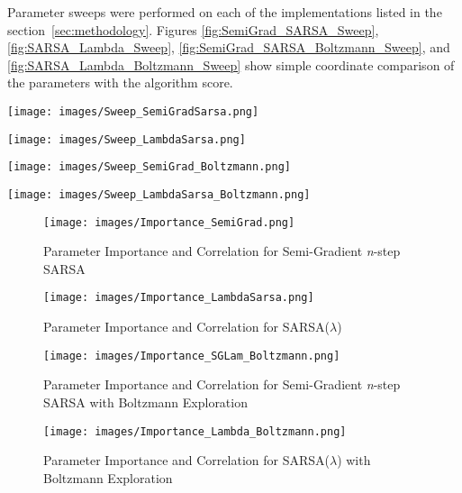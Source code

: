 \documentclass[journal]{IEEEtran}
\begin{document}
Parameter sweeps were performed on each of the implementations listed in the 
section~\ref{sec:methodology}. Figures \ref{fig:SemiGrad_SARSA_Sweep}, \ref{fig:SARSA_Lambda_Sweep},
\ref{fig:SemiGrad_SARSA_Boltzmann_Sweep}, and \ref{fig:SARSA_Lambda_Boltzmann_Sweep} 
show simple coordinate comparison of the parameters with the algorithm score.

\begin{figure*}
  \texttt{[image: images/Sweep\_SemiGradSarsa.png]}
  \caption{Parameter Sweep for Semi-Gradient \emph{n}-step SARSA}
  \label{fig:SemiGrad_SARSA_Sweep}
\end{figure*}
\begin{figure*}
  \texttt{[image: images/Sweep\_LambdaSarsa.png]}
  \caption{Parameter Sweep for SARSA(\(\lambda\))}
  \label{fig:SARSA_Lambda_Sweep}
\end{figure*}
\begin{figure*}
  \texttt{[image: images/Sweep\_SemiGrad\_Boltzmann.png]}
  \caption{Parameter Sweep for Semi-Gradient \emph{n}-step SARSA with Boltzmann Exploration}
  \label{fig:SemiGrad_SARSA_Boltzmann_Sweep}
\end{figure*}
\begin{figure*}
  \texttt{[image: images/Sweep\_LambdaSarsa\_Boltzmann.png]}
  \caption{Parameter Sweep for SARSA(\(\lambda\)) with Boltzmann Exploration}
  \label{fig:SARSA_Lambda_Boltzmann_Sweep}
\end{figure*}

\begin{figure}
  \texttt{[image: images/Importance\_SemiGrad.png]}
  \caption{Parameter Importance and Correlation for Semi-Gradient \emph{n}-step SARSA}
  \label{fig:SemiGrad_SARSA_Importance}
\end{figure}
\begin{figure}
  \texttt{[image: images/Importance\_LambdaSarsa.png]}
  \caption{Parameter Importance and Correlation for SARSA(\(\lambda\))}
  \label{fig:SARSA_Lambda_Importance}
\end{figure}
\begin{figure}
  \texttt{[image: images/Importance\_SGLam\_Boltzmann.png]}
  \caption{Parameter Importance and Correlation for Semi-Gradient \emph{n}-step 
  SARSA with Boltzmann Exploration}
  \label{fig:SemiGrad_SARSA_Boltz_Importance}
\end{figure}
\begin{figure}
  \texttt{[image: images/Importance\_Lambda\_Boltzmann.png]}
  \caption{Parameter Importance and Correlation for SARSA(\(\lambda\)) with Boltzmann Exploration}
  \label{fig:SARSA_Lambda_Boltz_Importance}
\end{figure}
\end{document}

